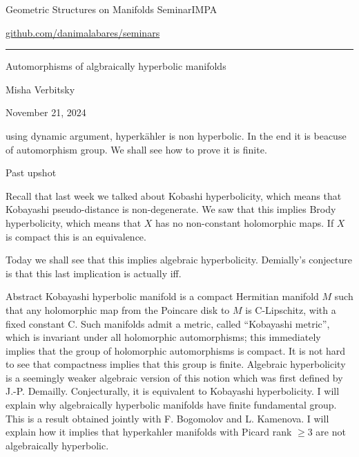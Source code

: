 


\begin{minipage}{\textwidth}
	\begin{minipage}{1\textwidth}
		Geometric Structures on Manifolds Seminar\hfill IMPA
		
		{\small\hfill\href{https://github.com/danimalabares/seminars}{github.com/danimalabares/seminars}}
		
	\end{minipage}
\end{minipage}\vspace{.2cm}\hrule

\vspace{10pt}

{\Huge Automorphisms of algbraically hyperbolic manifolds}

\hfill{\Large Misha Verbitsky}

\hfill{\large November 21, 2024}

\tableofcontents
\begin{upshot}\leavevmode
using dynamic argument, hyperkähler is non hyperbolic. In the end it is beacuse of automorphism group. We shall see how to prove it is finite.
\end{upshot}
\begin{thing3}{Past upshot}\leavevmode
	
Recall that last week we talked about Kobashi hyperbolicity, which means that Kobayashi pseudo-distance is non-degenerate. We saw that this implies Brody hyperbolicity, which means that $X$ has no non-constant holomorphic maps. If $X$ is compact this is an equivalence.

Today we shall see that this implies algebraic hyperbolicity. Demially's conjecture is that this last implication is actually iff.
\end{thing3}

\begin{thing3}{Abstract}\leavevmode
	Kobayashi hyperbolic manifold is a compact Hermitian manifold $M$
 such that any holomorphic map from the Poincare disk to $M$
 is C-Lipschitz, with a fixed constant C. Such manifolds admit a metric, called ``Kobayashi metric'', which is invariant under all holomorphic automorphisms; this immediately implies that the group of holomorphic automorphisms is compact. It is not hard to see that compactness implies that this group is finite. Algebraic hyperbolicity is a seemingly weaker algebraic version of this notion which was first defined by J.-P. Demailly. Conjecturally, it is equivalent to Kobayashi hyperbolicity. I will explain why algebraically hyperbolic manifolds have finite fundamental group. This is a result obtained jointly with F. Bogomolov and L. Kamenova. I will explain how it implies that hyperkahler manifolds with Picard rank $\geq 3$
 are not algebraically hyperbolic.
\end{thing3}

